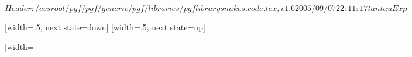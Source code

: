 \ProvidesPackageRCS[v\pgfversion] $Header: /cvsroot/pgf/pgf/generic/pgf/libraries/pgflibrarysnakes.code.tex,v 1.6 2005/09/07 22:11:17 tantau Exp $

%


\newdimen\pgfsnakesegmentamplitude
\newdimen\pgfsnakesegmentlength
\def\pgfsnakesegmentangle{45}
\def\pgfsnakesegmentobjectlength{\pgfsnakesegmentamplitude}
\def\pgfsnakesegmentaspect{0.5}

\pgfsnakesegmentlength=10pt
\pgfsnakesegmentamplitude=2.5pt



%

{
  [width=.5\pgfsnakesegmentlength,%
             next state=down]
  {
    \pgfpathlineto{\pgfpoint{.25\pgfsnakesegmentlength}{\pgfsnakesegmentamplitude}}
    \pgfpathlineto{\pgfpoint{.5\pgfsnakesegmentlength}{0pt}}
  }
  [width=.5\pgfsnakesegmentlength,%
               next state=up]
  {
    \pgfpathlineto{\pgfpoint{.25\pgfsnakesegmentlength}{-\pgfsnakesegmentamplitude}}
    \pgfpathlineto{\pgfpoint{.5\pgfsnakesegmentlength}{0pt}}
  }
  { \pgfpathlineto{\pgfpoint{\pgfsnakeremainingdistance}{0pt}} }
}



%

{
  [width=\pgfsnakesegmentlength]
  {
    \pgfpathlineto{\pgfpoint{\pgfsnakesegmentlength}{\pgfsnakesegmentamplitude}}
    \pgfpathlineto{\pgfpoint{\pgfsnakesegmentlength}{0pt}}
  }
  {
    \pgfpathlineto{\pgfpoint{\pgfsnakeremainingdistance}{0pt}}
  }
}


%

